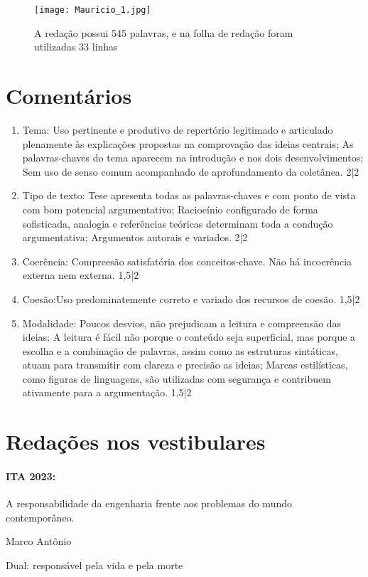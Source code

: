 \documentclass{article}
\begin{document}
\newpage
\begin{figure}
\centering
\texttt{[image: Mauricio\_1.jpg]}
\caption{\label{}A redação possui 545 palavras, e na folha de redação foram utilizadas 33 linhas}
\end{figure}
\section*{Comentários}
\begin{enumerate}
\item Tema: Uso pertinente e produtivo de repertório legitimado e articulado plenamente às explicações propostas na comprovação das ideias centrais; As palavras-chaves do tema aparecem na introdução e nos dois desenvolvimentos; Sem uso de senso comum acompanhado de aprofundamento da coletânea. 2|2
\item Tipo de texto: Tese apresenta todas as palavras-chaves e com ponto de vista com bom potencial argumentativo; Raciocínio configurado de forma sofisticada, analogia e referências teóricas determinam toda a condução argumentativa; Argumentos autorais e variados. 2|2
\item Coerência: Compreesão satisfatória dos conceitos-chave. Não há incoerência externa nem externa. 1,5|2
\item Coesão:Uso predominatemente correto e variado dos recursos de coesão. 1,5|2
\item Modalidade: Poucos desvios, não prejudicam a leitura e compreensão das ideias; A leitura é fácil não porque o conteúdo seja superficial, mas porque a escolha e a combinação de palavras, assim como as estruturas sintáticas, atuam para transmitir com clareza e precisão as ideias; Marcas estilísticas, como figuras de linguagens, são utilizadas com segurança e contribuem ativamente para a argumentação. 1,5|2
\end{enumerate}
\newpage
\section*{Redações nos vestibulares} \paragraph{ ITA 2023:}A responsabilidade da engenharia frente aos problemas do mundo contemporâneo.
\begin{flushright} Marco Antônio \end{flushright}
Dual: responsável pela vida e pela morte
\end{document}
